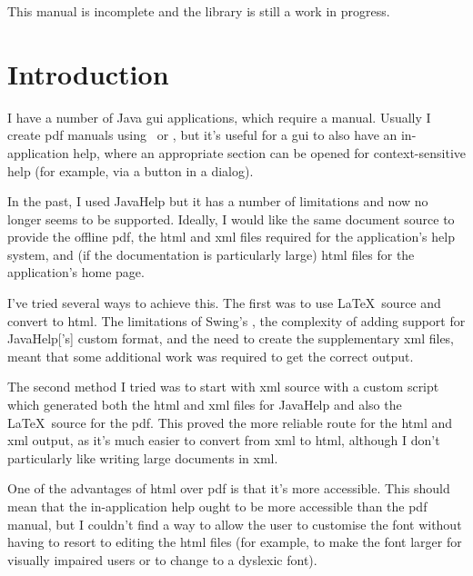 \documentclass[toc=listof]{scrreport}
\title{\TeXJavaHelp}
\author{Nicola L.C. Talbot\\\href{https://www.dickimaw-books.com/}{\nolinkurl{dickimaw-books.com}}}
\begin{document}
\maketitle

\begin{warning}
This manual is incomplete and the library is still a work in
progress.
\end{warning}

\frontmatter
\tableofcontents

\mainmatter
\chapter{Introduction}
\label{sec:intro}

I have a number of Java \gls{gui} applications, which require a manual.
Usually I create \gls{pdf} manuals using \pdfLaTeX\ or \LuaLaTeX, but
it's useful for a \gls{gui} to also have an in-application help, where 
an appropriate section can be opened for context-sensitive help (for example,
via a  button in a dialog).

In the past, I used \gls{JavaHelp} but it has a number of limitations and now
no longer seems to be supported. Ideally, I would like the same document source
to provide the offline \gls{pdf}, the \gls{html} and \gls{xml} files required
for the application's help system, and (if the documentation is particularly
large) \gls{html} files for the application's home page.

I've tried several ways to achieve this. The first was to use \LaTeX\ source
and convert to \gls{html}. The limitations of Swing's ,
the complexity of adding support for \gls{JavaHelp}['s] custom
 format, and the need to create the supplementary \gls{xml}
files, meant that some additional work was required to get the correct output.

The second method I tried was to start with \gls{xml} source with a custom
script which generated both the \gls{html} and \gls{xml} files for \gls{JavaHelp}
and also the \LaTeX\ source for the \gls{pdf}. This proved the more reliable route
for the \gls{html} and \gls{xml} output, as it's much easier to convert from \gls{xml}
to \gls{html}, although I don't particularly like writing large documents in 
\gls{xml}.

One of the advantages of \gls{html} over \gls{pdf} is that it's more accessible.
This should mean that the in-application help ought to be more accessible than the
\gls{pdf} manual, but I couldn't find a way to allow the user to customise the
font without having to resort to editing the \gls{html} files (for example, to
make the font larger for visually impaired users or to change to a dyslexic font).
\end{document}
